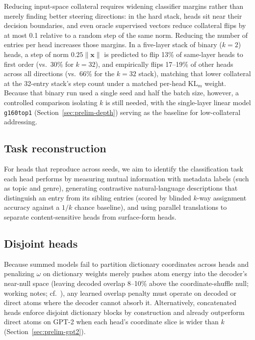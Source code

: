 Reducing input-space collateral requires widening classifier margins
rather than merely finding better steering directions: in the hard stack,
heads sit near their decision boundaries, and even oracle supervised
vectors reduce collateral flips by at most 0.1 relative to a random step
of the same norm. Reducing the number of entries per head increases those
margins. In a five-layer stack of binary ($k{=}2$) heads, a step of norm
$0.25\lVert\mathbf{x}\rVert$ is predicted to flip 13\% of same-layer
heads to first order (vs.\ 30\% for $k{=}32$), and empirically flips
17--19\% of other heads across all directions (vs.\ 66\% for the
$k{=}32$ stack), matching that lower collateral at the 32-entry stack's
step count under a matched per-head $\mathrm{KL}_m$ weight. Because that
binary run used a single seed and half the batch size, however, a
controlled comparison isolating $k$ is still needed, with the
single-layer linear model \texttt{g160top1} (Section~\ref{sec:prelim-depth})
serving as the baseline for low-collateral addressing.

\subsection{Task reconstruction}
For heads that reproduce across seeds, we aim to identify the classification
task each head performs by measuring mutual information with metadata
labels (such as topic and genre), generating contrastive natural-language
descriptions that distinguish an entry from its sibling entries (scored by
blinded $k$-way assignment accuracy against a $1/k$ chance baseline), and
using parallel translations to separate content-sensitive heads from
surface-form heads.

\subsection{Disjoint heads}
Because summed models fail to partition dictionary coordinates across
heads and penalizing $\omega$ on dictionary weights merely pushes atom
energy into the decoder's near-null space (leaving decoded overlap
8--10\% above the coordinate-shuffle null; working notes;
cf.~\cite[§5.1]{locatello2019}), any learned overlap penalty must operate
on decoded or direct atoms where the decoder cannot absorb it.
Alternatively, concatenated heads enforce disjoint dictionary blocks by
construction and already outperform direct atoms on GPT-2 when each
head's coordinate slice is wider than $k$ (Section~\ref{sec:prelim-gpt2}).

